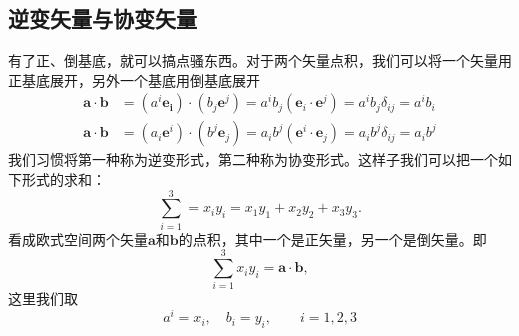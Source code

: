 \subsection{逆变矢量与协变矢量}
有了正、倒基底，就可以搞点骚东西。对于两个矢量点积，我们可以将一个矢量用正基底展开，另外一个基底用倒基底展开
\begin{equation}
\begin{aligned}
        \mathbf{a}\cdot \mathbf{b} &= (a^i\mathbf{{e}_i})\cdot (b_j \mathbf{e}^j) = a^ib_j (\mathbf{e}_i \cdot \mathbf{e}^j) = a^i b_j \delta_{ij} = a^i b_i\\
    \mathbf{a}\cdot \mathbf{b} &= (a_i \mathbf{e}^i)\cdot (b^j\mathbf{e}_j) = a_i b^j(\mathbf{e}^i \cdot \mathbf{e}_j) = a_i b^j \delta_{ij} =a_i b^j
\end{aligned}
\end{equation}
我们习惯将第一种称为逆变形式，第二种称为协变形式。这样子我们可以把一个如下形式的求和：
\begin{equation}
    \sum_{i =1}^3 = x_i y_i = x_1y_1 + x_2 y_2 + x_3 y_3.
\end{equation}
看成欧式空间两个矢量$\mathbf{a}$和$\mathbf{b}$的点积，其中一个是正矢量，另一个是倒矢量。即
\begin{equation}
    \sum_{i = 1}^3x_iy_i = \mathbf{a}\cdot \mathbf{b},
\end{equation}
这里我们取
\begin{equation}
    a^i = x_i, \quad b_i =y_i,\qquad i = 1,2,3
\end{equation}
